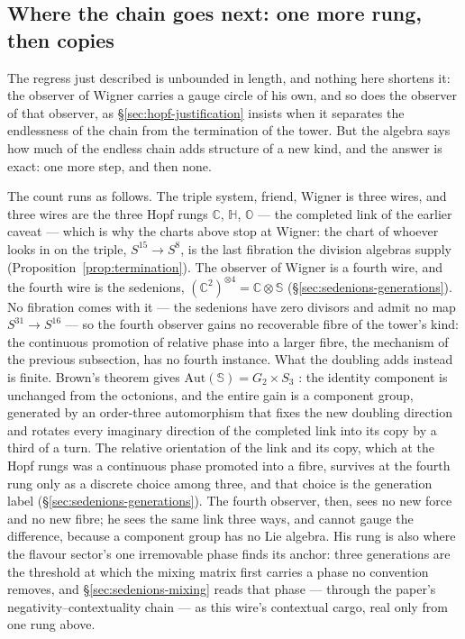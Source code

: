 \subsection{Where the chain goes next: one more rung, then copies}
\label{sec:wf-chain-type}

The regress just described is unbounded in length, and nothing here shortens
it: the observer of Wigner carries a gauge circle of his own, and so does the
observer of that observer, as \S\ref{sec:hopf-justification} insists when it
separates the endlessness of the chain from the termination of the tower. But
the algebra says how much of the endless chain adds structure of a new kind,
and the answer is exact: one more step, and then none.

The count runs as follows. The triple system, friend, Wigner is three wires,
and three wires are the three Hopf rungs $\mathbb{C}$, $\mathbb{H}$,
$\mathbb{O}$ --- the completed link of the earlier caveat --- which is why the
charts above stop at Wigner: the chart of whoever looks in on the triple,
$S^{15}\to S^{8}$, is the last fibration the division algebras supply
(Proposition~\ref{prop:termination}). The observer of Wigner is a fourth wire,
and the fourth wire is the sedenions,
$(\mathbb{C}^{2})^{\otimes 4} = \mathbb{C}\otimes\mathbb{S}$
(\S\ref{sec:sedenions-generations}). No fibration comes with it --- the
sedenions have zero divisors and admit no map $S^{31}\to S^{16}$ --- so the
fourth observer gains no recoverable fibre of the tower's kind: the continuous
promotion of relative phase into a larger fibre, the mechanism of the previous
subsection, has no fourth instance. What the doubling adds instead is finite.
Brown's theorem gives $\mathrm{Aut}(\mathbb{S}) = G_{2}\times S_{3}$
\autocite{brown1967generalized}: the identity component is unchanged from the
octonions, and the entire gain is a component group, generated by an
order-three automorphism that fixes the new doubling direction and rotates
every imaginary direction of the completed link into its copy by a third of a
turn. The relative orientation of the link and its copy, which at the Hopf
rungs was a continuous phase promoted into a fibre, survives at the fourth rung
only as a discrete choice among three, and that choice is the generation label
(\S\ref{sec:sedenions-generations}). The fourth observer, then, sees no new
force and no new fibre; he sees the same link three ways, and cannot gauge the
difference, because a component group has no Lie algebra. His rung is also where
the flavour sector's one irremovable phase finds its anchor: three generations
are the threshold at which the mixing matrix first carries a phase no convention
removes, and \S\ref{sec:sedenions-mixing} reads that phase --- through the
paper's negativity--contextuality chain --- as this wire's contextual cargo,
real only from one rung above.

